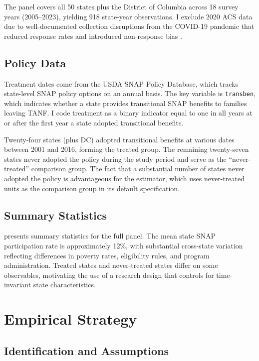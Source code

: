 \documentclass[12pt]{article}
\begin{document}
The panel covers all 50 states plus the District of Columbia across 18 survey years (2005--2023), yielding 918 state-year observations. I exclude 2020 ACS data due to well-documented collection disruptions from the COVID-19 pandemic that reduced response rates and introduced non-response bias \citep{census2021acs}.

\subsection{Policy Data}

Treatment dates come from the USDA SNAP Policy Database, which tracks state-level SNAP policy options on an annual basis. The key variable is \texttt{transben}, which indicates whether a state provides transitional SNAP benefits to families leaving TANF. I code treatment as a binary indicator equal to one in all years at or after the first year a state adopted transitional benefits.

Twenty-four states (plus DC) adopted transitional benefits at various dates between 2001 and 2016, forming the treated group. The remaining twenty-seven states never adopted the policy during the study period and serve as the ``never-treated'' comparison group. The fact that a substantial number of states never adopted the policy is advantageous for the \citet{callaway2021difference} estimator, which uses never-treated units as the comparison group in its default specification.

\subsection{Summary Statistics}



 presents summary statistics for the full panel. The mean state SNAP participation rate is approximately 12\%, with substantial cross-state variation reflecting differences in poverty rates, eligibility rules, and program administration. Treated states and never-treated states differ on some observables, motivating the use of a research design that controls for time-invariant state characteristics.


\section{Empirical Strategy}

\subsection{Identification and Assumptions}
\end{document}
